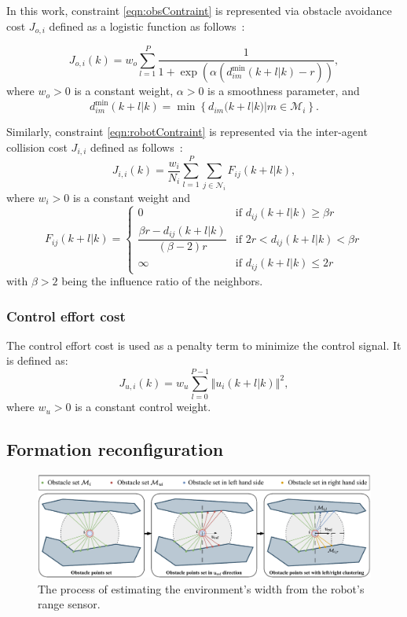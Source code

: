 In this work, constraint \eqref{eqn:obsContraint} is represented via obstacle avoidance cost $J_{o,i}$ defined as a logistic function as follows~\cite{8202163}:   

\begin{equation}
    J_{o,i}(k) = w_o\sum_{l=1}^P \dfrac{1}{1 + \exp{\left(\alpha\left(d_{im}^\text{min}(k+l|k) - r\right)\right)}},
\end{equation}
where $w_o > 0$ is a constant weight, $\alpha > 0$ is a smoothness parameter, and
\begin{equation}
    d_{im}^\text{min}(k+l|k)=\min\left\{d_{im}(k+l|k)|m\in\mathcal{M}_i\right\}.
\end{equation}

Similarly, constraint \eqref{eqn:robotContraint} is represented via the inter-agent collision cost $J_{i,i}$ defined as follows~\cite{736776}:
\begin{equation}
    J_{i,i}(k)=\dfrac{w_i}{N_i}\sum_{l=1}^P{\sum_{j\in\mathcal{N}_i}}F_{ij}(k+l|k),
\end{equation}
where $w_i>0$ is a constant weight and  
\begin{equation}
    F_{ij}(k+l|k)=\begin{cases}
        0   & \text{if } d_{ij}(k+l|k) \geq \beta r\\
        \dfrac{\beta r-d_{ij}(k+l|k)}{(\beta-2)r}    & \text{if } 2r < d_{ij}(k+l|k) < \beta r\\
        \infty  & \text{if } d_{ij}(k+l|k) \leq 2r
    \end{cases}
\end{equation} 
with $\beta>2$ being the influence ratio of the neighbors.

\subsubsection{Control effort cost}
The control effort cost is used as a penalty term to minimize the control signal. It is defined as:
\begin{equation}
    J_{u,i}(k)=w_u\sum_{l=0}^{P-1}\left\Vert u_i(k+l|k)\right\Vert^2,
\end{equation}
where $w_u>0$ is a constant control weight.

\subsection{Formation reconfiguration}\label{sec:obs_aware}
\begin{figure}
    \centering
    \includegraphics[width=\textwidth]{paper3/images/perception.pdf}
    \caption{The process of estimating the environment's width from the robot's range sensor.}
    \label{fig:perception}
\end{figure}

